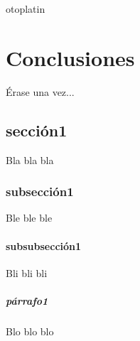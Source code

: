 otoplatin\documentclass[a4paper,openright,12pt]{report}
\begin{document}
\chapter{Conclusiones}\label{cap.conclusiones}
Érase una vez...
\section{sección1}
Bla bla bla
\subsection{subsección1}
Ble ble ble
\subsubsection{subsubsección1}
Bli bli bli
\paragraph{párrafo1}
Blo blo blo

\end{document}
